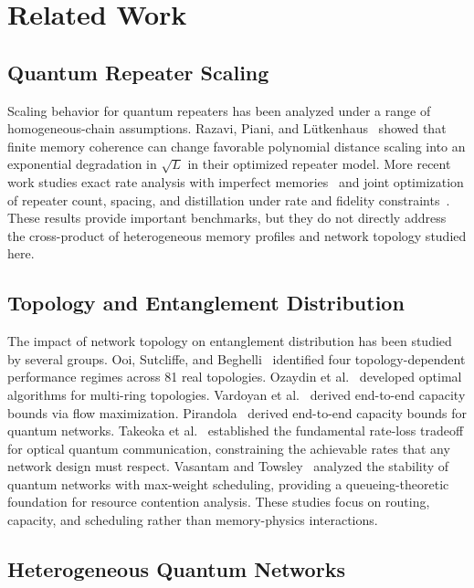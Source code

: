 \documentclass[quantumrep,article,submit,moreauthors]{Definitions/mdpi}
\begin{document}
\section{Related Work}

\subsection{Quantum Repeater Scaling}

{\sloppy
Scaling behavior for quantum repeaters has been analyzed under a range of homogeneous-chain assumptions. Razavi, Piani, and L{\"u}tkenhaus~\cite{razavi2009quantum} showed that finite memory coherence can change favorable polynomial distance scaling into an exponential degradation in $\sqrt{L}$ in their optimized repeater model. More recent work studies exact rate analysis with imperfect memories~\cite{kamin2023exact} and joint optimization of repeater count, spacing, and distillation under rate and fidelity constraints~\cite{chehimi2023scaling}. These results provide important benchmarks, but they do not directly address the cross-product of heterogeneous memory profiles and network topology studied here.
}

\subsection{Topology and Entanglement Distribution}

The impact of network topology on entanglement distribution has been studied by several groups. Ooi, Sutcliffe, and Beghelli~\cite{alhejji2026topology} identified four topology-dependent performance regimes across 81 real topologies. Ozaydin et al.~\cite{ozaydin2025multiring} developed optimal algorithms for multi-ring topologies. Vardoyan et al.~\cite{amin2023capacity} derived end-to-end capacity bounds via flow maximization. Pirandola~\cite{pirandola2019endtoend} derived end-to-end capacity bounds for quantum networks. Takeoka et al.~\cite{takeoka2016rateloss} established the fundamental rate-loss tradeoff for optical quantum communication, constraining the achievable rates that any network design must respect. Vasantam and Towsley~\cite{vardoyan2021maxweight} analyzed the stability of quantum networks with max-weight scheduling, providing a queueing-theoretic foundation for resource contention analysis. These studies focus on routing, capacity, and scheduling rather than memory-physics interactions.

\subsection{Heterogeneous Quantum Networks}
\end{document}
